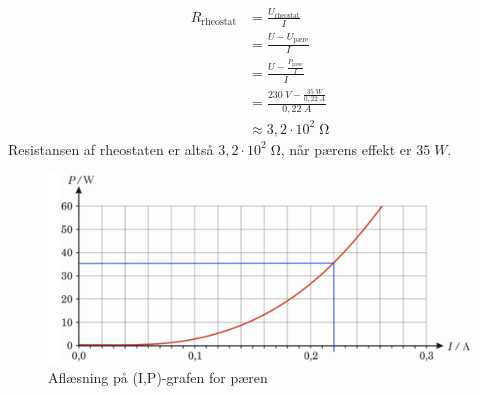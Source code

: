 \documentclass{report}
\begin{document}
\begin{equation*}
\begin{split}
  R _{\text{rheostat} }&=\frac{U _{\text{rheostat} }}{I}\\
  &=\frac{U-U _{\text{pære} }}{I}\\
  &=\frac{U-\frac{P _{\text{pære} }}{I}}{I}\\
  &=\frac{230 \;\unit{V} - \frac{35 \;\unit{W} }{0,22 \;\unit{A} }}{0,22 \;\unit{A} }\\
  &\approx 3,2 \cdot 10^2 \;\unit{\ohm} 
\end{split}
\end{equation*}
Resistansen af rheostaten er altså $3,2 \cdot 10^2 \;\unit{\ohm}$, når pærens effekt er $35 \;\unit{W} $.
\begin{figure}[H]
\begin{center}
  \includegraphics[width=\textwidth]{IP.png}
\end{center}
  \caption{Aflæsning på (I,P)-grafen for pæren}
\label{fig:IP}
\end{figure}
\end{document}
